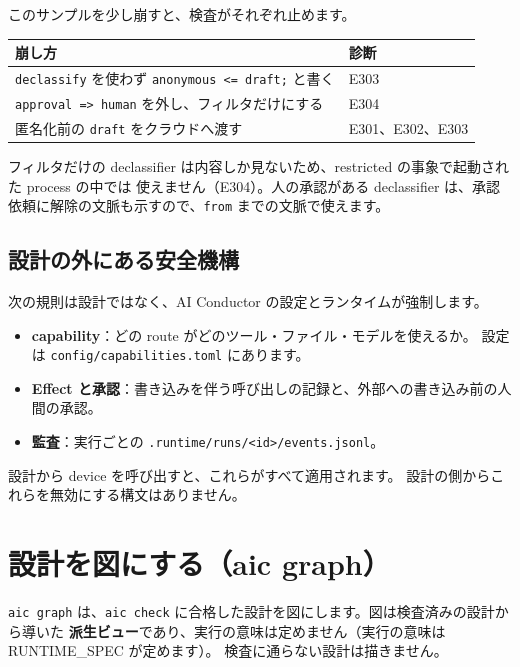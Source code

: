 \documentclass[a4paper,11pt]{ltjsarticle}
\begin{document}
このサンプルを少し崩すと、検査がそれぞれ止めます。

\begin{center}
\small
\begin{tabular}{ll}
\toprule
崩し方 & 診断 \\
\midrule
\texttt{declassify} を使わず \texttt{anonymous <= draft;} と書く & E303 \\
\texttt{approval => human} を外し、フィルタだけにする & E304 \\
匿名化前の \texttt{draft} をクラウドへ渡す & E301、E302、E303 \\
\bottomrule
\end{tabular}
\end{center}

フィルタだけの declassifier は内容しか見ないため、restricted の事象で起動された process の中では
使えません（E304）。人の承認がある declassifier は、承認依頼に解除の文脈も示すので、\texttt{from}
までの文脈で使えます。

\subsection{設計の外にある安全機構}

次の規則は設計ではなく、AI Conductor の設定とランタイムが強制します。
\begin{itemize}
  \item \textbf{capability}：どの route がどのツール・ファイル・モデルを使えるか。
        設定は \nolinkurl{config/capabilities.toml} にあります。
  \item \textbf{Effect と承認}：書き込みを伴う呼び出しの記録と、外部への書き込み前の人間の承認。
  \item \textbf{監査}：実行ごとの \texttt{.runtime/runs/<id>/events.jsonl}。
\end{itemize}
設計から device を呼び出すと、これらがすべて適用されます。
設計の側からこれらを無効にする構文はありません。

\section{設計を図にする（aic graph）}\label{sec:graph}

\texttt{aic graph} は、\texttt{aic check} に合格した設計を図にします。図は検査済みの設計から導いた
\textbf{派生ビュー}であり、実行の意味は定めません（実行の意味は RUNTIME\_SPEC が定めます）。
検査に通らない設計は描きません。
\end{document}
